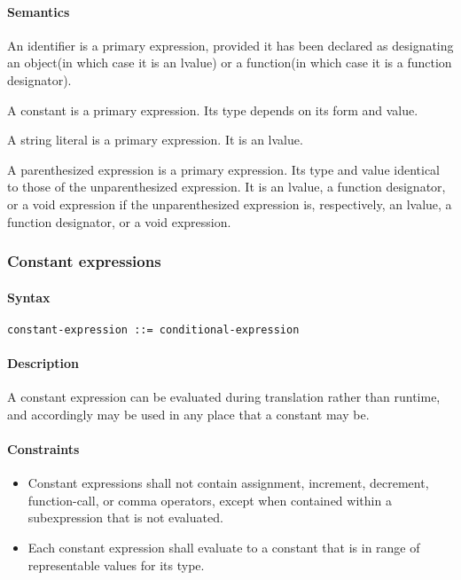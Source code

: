 \documentclass{article}
\begin{document}
\paragraph*{Semantics}
An identifier is a primary expression, provided it has been declared as designating an 
object(in which case it is an lvalue) or a function(in which case it is a function 
designator).
\linebreak

A constant is a primary expression. Its type depends on its form and value.
\linebreak

A string literal is a primary expression.  It is an lvalue.
\linebreak

A parenthesized expression is a primary expression.  Its type and value identical to 
those of the unparenthesized expression.  It is an lvalue, a function designator, or a 
void expression if the unparenthesized expression is, respectively, an lvalue, a 
function designator, or a void expression.

\subsubsection{Constant expressions}
\paragraph*{Syntax}
\begin{lstlisting}[language=bnf]
constant-expression ::= conditional-expression
\end{lstlisting}
\paragraph*{Description}
A constant expression can be evaluated during translation rather than runtime, and
accordingly may be used in any place that a constant may be.
\paragraph*{Constraints}
\begin{itemize}
	\item Constant expressions shall not contain assignment, increment, decrement,
		  function-call, or comma operators, except when contained within a subexpression
		  that is not evaluated.
	\item Each constant expression shall evaluate to a constant that is in range of
		  representable values for its type.
\end{itemize}
\end{document}
